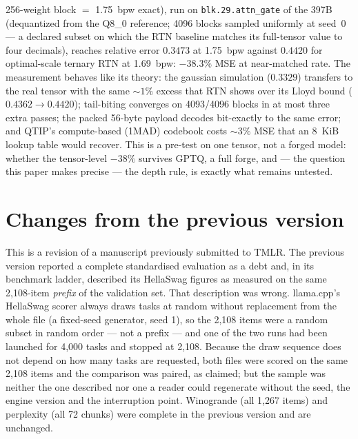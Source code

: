 \documentclass[10pt]{article} %
\begin{document}
\begin{itemize}
  256-weight block $=$ 1.75~bpw
  exact), run on \texttt{blk.29.attn\_gate} of the 397B (dequantized from
  the Q8\_0 reference; 4096 blocks sampled uniformly at seed~0 --- a
  declared subset on which the RTN baseline matches its full-tensor value
  to four decimals), reaches relative error $0.3473$ at 1.75~bpw against
  $0.4420$ for optimal-scale ternary RTN at 1.69~bpw: $-38.3\%$ MSE at
  near-matched rate. The measurement behaves like its theory: the gaussian
  simulation ($0.3329$) transfers to the real tensor with the same
  ${\sim}1\%$ excess that RTN shows over its Lloyd bound
  ($0.4362 \to 0.4420$); tail-biting converges on 4093/4096 blocks in at
  most three extra passes; the packed 56-byte payload decodes bit-exactly
  to the same error; and QTIP's compute-based (1MAD) codebook
  \citep{tseng2024qtip} costs
  ${\sim}3\%$ MSE that an 8~KiB lookup table would recover. This is a
  pre-test on one tensor, not a forged model: whether the tensor-level
  $-38\%$ survives GPTQ, a full forge, and --- the question this paper
  makes precise --- the depth rule, is exactly what remains untested.
\end{itemize}

\section{Changes from the previous version}
\label{sec:changes}


This is a revision of a manuscript previously submitted to TMLR. The previous
version reported a complete standardised evaluation as a debt and, in its
benchmark ladder, described its HellaSwag figures as measured on the same
2,108-item \emph{prefix} of the validation set. That description was wrong.
llama.cpp's HellaSwag scorer always draws tasks at random without replacement
from the whole file (a fixed-seed generator, seed 1), so the 2,108 items were a
random subset in random order --- not a prefix --- and one of the two runs had
been launched for 4,000 tasks and stopped at 2,108. Because the draw sequence
does not depend on how many tasks are requested, both files were scored on the
same 2,108 items and the comparison was paired, as claimed; but the sample was
neither the one described nor one a reader could regenerate without the seed,
the engine version and the interruption point. Winogrande (all 1,267 items) and
perplexity (all 72 chunks) were complete in the previous version and are
unchanged.
\end{document}
